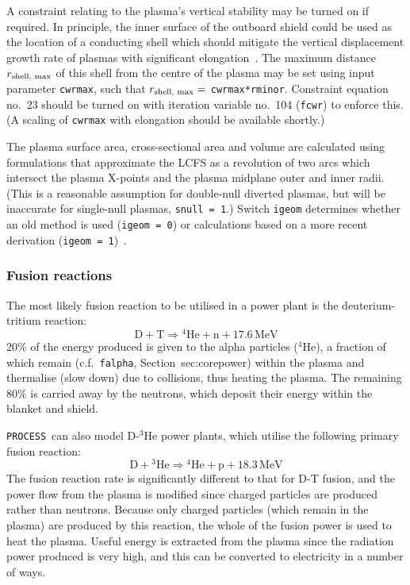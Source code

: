 \documentclass[11pt,a4paper]{report}
\newcommand{\process}{\mbox{\texttt{PROCESS}}}
\begin{document}
A constraint relating to the plasma's vertical stability may be turned on if
required. In principle, the inner surface of the outboard shield could be used
as the location of a conducting shell which should mitigate the vertical
displacement growth rate of plasmas with significant
elongation~\cite{Sakamoto}. The maximum distance $r_{\mbox{\scriptsize shell,
  max}}$ of this shell from the centre of the plasma may be set using input
parameter \texttt{cwrmax}, such that $r_{\mbox{\scriptsize shell, max}} = $
\texttt{cwrmax*rminor}. Constraint equation no.\ 23 should be turned on with
iteration variable no.\ 104 (\texttt{fcwr}) to enforce this. (A scaling of
\texttt{cwrmax} with elongation should be available shortly.)

The plasma surface area, cross-sectional area and volume are calculated using
formulations that approximate the LCFS as a revolution of two arcs which
intersect the plasma X-points and the plasma midplane outer and inner
radii. (This is a reasonable assumption for double-null diverted plasmas, but
will be inaccurate for single-null plasmas, \texttt{snull = 1}.) Switch
\texttt{igeom} determines whether an old method is used (\texttt{igeom = 0})
or calculations based on a more recent derivation (\texttt{igeom =
  1})~\cite{logbook14_41}.

\subsubsection{Fusion reactions}
\label{sec:fusion_reactions}

The most likely fusion reaction to be utilised in a power plant is the
deuterium-tritium reaction:
\begin{equation}
\mathrm{D + T} \Longrightarrow \mathrm{^{4}He + n + 17.6 \,MeV}
\label{eqn:d-t}
\end{equation}
20\% of the energy produced is given to the alpha particles ($^4$He), a
fraction of which remain (c.f.\ \texttt{falpha}, Section~{sec:corepower})
within the plasma and thermalise (slow down) due to collisions, thus heating
the plasma. The remaining 80\% is carried away by the neutrons, which deposit
their energy within the blanket and shield.

\process\ can also model D-$^3$He power plants, which utilise the following primary
fusion reaction:
\begin{equation}
\mathrm{D + \mbox{$^3$He}} \Longrightarrow \mathrm{^{4}He + p + 18.3 \,MeV}
\label{eqn:dhe3}
\end{equation}
The fusion reaction rate is significantly different to that for D-T fusion,
and the power flow from the plasma is modified since charged particles are
produced rather than neutrons. Because only charged particles (which remain in
the plasma) are produced by this reaction, the whole of the fusion power is
used to heat the plasma. Useful energy is extracted from the plasma since the
radiation power produced is very high, and this can be converted to
electricity in a number of ways.
\end{document}
